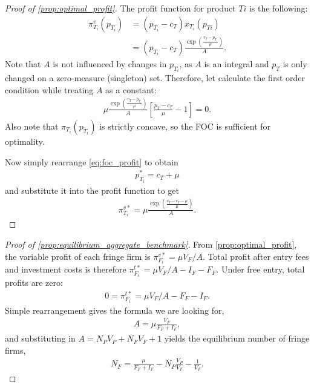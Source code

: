 \documentclass[a4paper]{article}
\begin{document}
\begin{proof}[Proof of \cref{prop:optimal_profit}]
    The profit function for product $Ti$ is the following:
    \begin{align*}
        \pi^v_{T_i}(p_{T_i}) &= (p_{T_i} - c_T) x_{T_i}(p_{Ti}) \\
        &= (p_{T_i} - c_T) \frac{\exp\left( \frac{v_T - p_{T_i}}{\mu} \right)}{A}.
    \end{align*}
    Note that $A$ is not influenced by changes in $p_{T_i}$, as $A$ is an integral and $p_T$ is only changed on a zero-measure (singleton) set.
    Therefore, let calculate the first order condition while treating $A$ as a constant:
    \begin{align}
        \label{eq:foc_profit}
        \mu \frac{\exp\left( \frac{v_T - p_{T_i}}{\mu} \right)}{A} \left[ \frac{p_T - c_T}{\mu} - 1 \right] = 0.
    \end{align}
    Also note that $\pi_{T_i}(p_{T_i})$ is strictly concave, so the FOC is sufficient for optimality.

    Now simply rearrange \cref{eq:foc_profit} to obtain
    \begin{align*}
        p_{T_i}^* = c_T + \mu
    \end{align*}
    and substitute it into the profit function to get
    \begin{align*}
        \pi_{T_i}^{v*} = \mu \frac{\exp \left( \frac{v_T - c_T - \mu}{\mu} \right)}{A}.
    \end{align*}
\end{proof}

\begin{proof}[Proof of \cref{prop:equilibrium_aggregate_benchmark}]
    From \cref{prop:optimal_profit}, the variable profit of each fringe firm is $\pi_{F_i}^{v*} = \mu V_F / A$.
    Total profit after entry fees and investment costs is therefore $\pi_{F_i}^{t*} = \mu V_F / A - I_F - F_F$.
    Under free entry, total profits are zero:
    \begin{align*}
        0 = \pi_{F_i}^{t*} = \mu V_F / A - F_F - I_F.
    \end{align*}
    Simple rearrangement gives the formula we are looking for,
    \begin{align*}
        A = \mu \frac{V_F}{F_F + I_F},
    \end{align*}
    and substituting in $A = N_P V_P + N_F V_F + 1$ yields the equilibrium number of fringe firms,
    \begin{align*}
        N_F = \frac{\mu}{F_F + I_F} - N_P \frac{V_P}{V_F} - \frac{1}{V_F}.
    \end{align*}
\end{proof}
\end{document}
